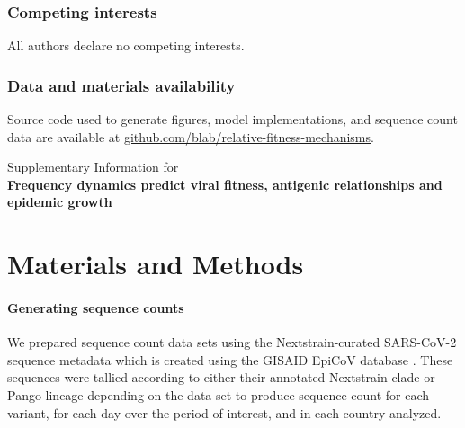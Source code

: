 \documentclass[11pt,oneside,letterpaper]{article}
\begin{document}
\subsubsection*{Competing interests}

All authors declare no competing interests.

\subsubsection*{Data and materials availability}

Source code used to generate figures, model implementations, and sequence count data are available at \href{https://github.com/blab/relative-fitness-mechanisms}{github.com/blab/relative-fitness-mechanisms}.




\newpage

\appendix

\setcounter{figure}{0}
\setcounter{table}{0}
\setcounter{page}{1}
\renewcommand{\thefigure}{S\arabic{figure}}
\renewcommand{\thetable}{S\arabic{table}}
\renewcommand{\thepage}{S\arabic{page}}
\renewcommand{\thesubsection}{S\arabic{subsection}}

\begin{center}\Large
Supplementary Information for \\
\bf Frequency dynamics predict viral fitness, antigenic relationships and epidemic growth
\end{center}

\section*{Materials and Methods}

\paragraph{Generating sequence counts}

We prepared sequence count data sets using the Nextstrain-curated SARS-CoV-2 sequence metadata \cite{Hadfield2018} which is created using the GISAID EpiCoV database \cite{khare2021gisaid}.
These sequences were tallied according to either their annotated Nextstrain clade or Pango lineage \cite{aksamentov2021nextclade} depending on the data set to produce sequence count for each variant, for each day over the period of interest, and in each country analyzed.
\end{document}
